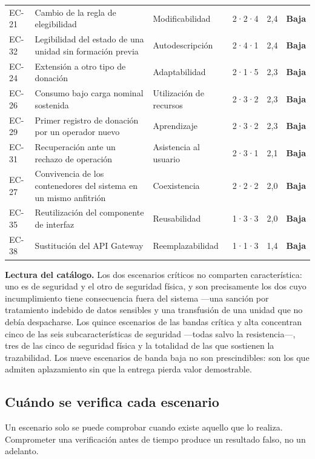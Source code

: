 \documentclass[11pt,a4paper]{article}
\newcommand{\bbaja}{\textcolor{ringEvitar}{\textbf{Baja}}}
\begin{document}
\begin{longtable}{L{1.2cm} L{4.4cm} L{2.8cm} L{1.7cm} L{0.9cm} L{1.6cm}}
EC-21 & Cambio de la regla de elegibilidad & Modificabilidad & 2·2·4 & 2,4 & \bbaja{} \\
EC-32 & Legibilidad del estado de una unidad sin formación previa & Autodescripción & 2·4·1 & 2,4 & \bbaja{} \\
EC-24 & Extensión a otro tipo de donación & Adaptabilidad & 2·1·5 & 2,3 & \bbaja{} \\
EC-26 & Consumo bajo carga nominal sostenida & Utilización de recursos & 2·3·2 & 2,3 & \bbaja{} \\
EC-29 & Primer registro de donación por un operador nuevo & Aprendizaje & 2·3·2 & 2,3 & \bbaja{} \\
EC-31 & Recuperación ante un rechazo de operación & Asistencia al usuario & 2·3·1 & 2,1 & \bbaja{} \\
EC-27 & Convivencia de los contenedores del sistema en un mismo anfitrión & Coexistencia & 2·2·2 & 2,0 & \bbaja{} \\
EC-35 & Reutilización del componente de interfaz & Reusabilidad & 1·3·3 & 2,0 & \bbaja{} \\
EC-38 & Sustitución del API Gateway & Reemplazabilidad & 1·1·3 & 1,4 & \bbaja{} \\
\end{longtable}

\noindent\textbf{Lectura del catálogo.} Los dos escenarios críticos no comparten característica: uno es de seguridad y el otro de seguridad física, y son precisamente los dos cuyo incumplimiento tiene consecuencia fuera del sistema ---una sanción por tratamiento indebido de datos sensibles y una transfusión de una unidad que no debía despacharse. Los quince escenarios de las bandas crítica y alta concentran cinco de las seis subcaracterísticas de seguridad ---todas salvo la resistencia---, tres de las cinco de seguridad física y la totalidad de las que sostienen la trazabilidad. Los nueve escenarios de banda baja no son prescindibles: son los que admiten aplazamiento sin que la entrega pierda valor demostrable.

\subsection{Cuándo se verifica cada escenario}

Un escenario solo se puede comprobar cuando existe aquello que lo realiza. Comprometer una verificación antes de tiempo produce un resultado falso, no un adelanto.
\end{document}
